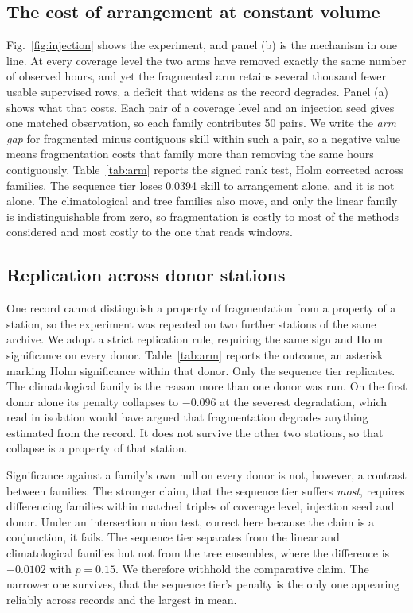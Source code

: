\documentclass[conference]{IEEEtran}
\begin{document}
\subsection{The cost of arrangement at constant volume}

Fig.~\ref{fig:injection} shows the experiment, and panel (b) is the mechanism in one line. At
every coverage level the two arms have removed exactly the same number of observed hours, and
yet the fragmented arm retains several thousand fewer usable supervised rows, a deficit that
widens as the record degrades. Panel (a) shows what that costs. Each pair of a coverage level
and an injection seed gives one matched observation, so each family contributes 50 pairs. We
write the \emph{arm gap} for fragmented minus contiguous skill within such a pair, so a
negative value means fragmentation costs that family more than removing the same hours
contiguously. Table~\ref{tab:arm} reports the signed rank test, Holm corrected across
families. The sequence tier loses 0.0394 skill to arrangement alone, and it is not alone. The
climatological and tree families also move, and only the linear family is indistinguishable
from zero, so fragmentation is costly to most of the methods considered and most costly to the
one that reads windows.

\subsection{Replication across donor stations}

One record cannot distinguish a property of fragmentation from a property of a station, so
the experiment was repeated on two further stations of the same archive. We adopt a strict
replication rule, requiring the same sign and Holm significance on every donor.
Table~\ref{tab:arm} reports the outcome, an asterisk marking Holm significance within that
donor. Only the sequence tier replicates. The climatological
family is the reason more than one donor was run. On the first donor alone its penalty collapses
to $-0.096$ at the severest degradation, which read in isolation would have argued that
fragmentation degrades anything estimated from the record. It does not survive the other two
stations, so that collapse is a property of that station.

Significance against a family's own null on every donor is not, however, a contrast between
families. The stronger claim, that the sequence tier suffers \emph{most}, requires differencing
families within matched triples of coverage level, injection seed and donor. Under an
intersection union test, correct here because the claim is a conjunction, it fails. The
sequence tier separates from the linear and climatological families but not from the tree
ensembles, where the difference is $-0.0102$ with $p=0.15$. We therefore withhold the
comparative claim. The narrower one survives, that the sequence tier's penalty is the only one
appearing reliably across records and the largest in mean.
\end{document}
